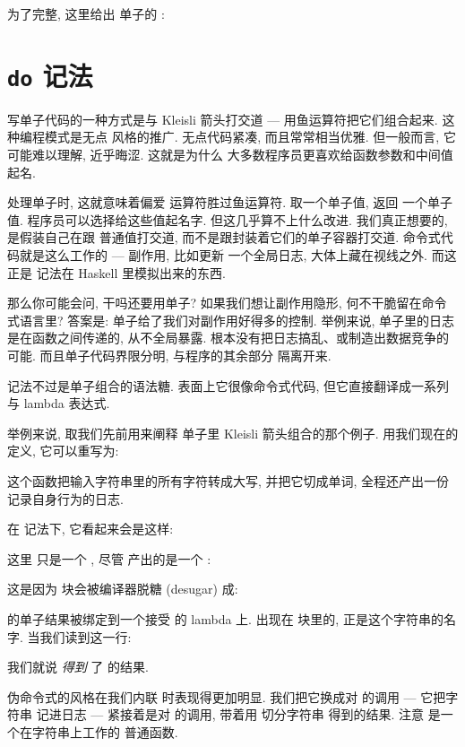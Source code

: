 为了完整, 这里给出  单子的 :


\section{\texttt{do} 记法}

写单子代码的一种方式是与 Kleisli 箭头打交道 --- 用鱼运算符把它们组合起来. 这种编程模式是无点
风格的推广. 无点代码紧凑, 而且常常相当优雅. 但一般而言, 它可能难以理解, 近乎晦涩. 这就是为什么
大多数程序员更喜欢给函数参数和中间值起名.

处理单子时, 这就意味着偏爱  运算符胜过鱼运算符.  取一个单子值, 返回
一个单子值. 程序员可以选择给这些值起名字. 但这几乎算不上什么改进. 我们真正想要的, 是假装自己在跟
普通值打交道, 而不是跟封装着它们的单子容器打交道. 命令式代码就是这么工作的 --- 副作用, 比如更新
一个全局日志, 大体上藏在视线之外. 而这正是  记法在 Haskell 里模拟出来的东西.

那么你可能会问, 干吗还要用单子? 如果我们想让副作用隐形, 何不干脆留在命令式语言里? 答案是:
单子给了我们对副作用好得多的控制. 举例来说,  单子里的日志是在函数之间传递的,
从不全局暴露. 根本没有把日志搞乱、或制造出数据竞争的可能. 而且单子代码界限分明, 与程序的其余部分
隔离开来.

 记法不过是单子组合的语法糖. 表面上它很像命令式代码, 但它直接翻译成一系列 
与 lambda 表达式.

举例来说, 取我们先前用来阐释  单子里 Kleisli 箭头组合的那个例子. 用我们现在的
定义, 它可以重写为:

这个函数把输入字符串里的所有字符转成大写, 并把它切成单词, 全程还产出一份记录自身行为的日志.

在  记法下, 它看起来会是这样:

这里  只是一个 , 尽管  产出的是一个 :

这是因为  块会被编译器脱糖 (desugar) 成:

 的单子结果被绑定到一个接受  的 lambda 上. 出现在 
块里的, 正是这个字符串的名字. 当我们读到这一行:

我们就说  \emph{得到} 了  的结果.

伪命令式的风格在我们内联  时表现得更加明显. 我们把它换成对  的调用
--- 它把字符串  记进日志 --- 紧接着是对  的调用, 带着用
 切分字符串  得到的结果. 注意  是一个在字符串上工作的
普通函数.

